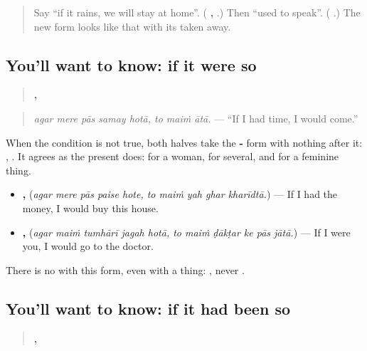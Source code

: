 \label{lesson:HI-C287-hotatoata}



\begin{quote}
Say \textquotedblleft{}if it rains, we will stay at home\textquotedblright{}. (\textbf{  ,     }.) Then \textquotedblleft{}used to speak\textquotedblright{}. (\textbf{ }.) The new form looks like that \textbf{} with its \textbf{} taken away.
\end{quote}

\subsection*{You'll want to know: if it were so}
\begin{quote}
\textbf{    ,   }
\end{quote}

\begin{quote}
\emph{agar mere pās samay hotā, to maiṁ ātā.} — \textquotedblleft{}If I had time, I would come.\textquotedblright{}
\end{quote}

When the condition is not true, both halves take the \textbf{-} form with nothing after it: \textbf{}, \textbf{}. It agrees as the present does: \textbf{} for a woman, \textbf{} for several, and \textbf{} for a feminine thing.

\begin{itemize}
\raggedright
  \item \textbf{    ,     } (\emph{agar mere pās paise hote, to maiṁ yah ghar kharīdtā.}) — If I had the money, I would buy this house.
  \item \textbf{    ,      } (\emph{agar maiṁ tumhārī jagah hotā, to maiṁ ḍākṭar ke pās jātā.}) — If I were you, I would go to the doctor.
\end{itemize}

There is no \textbf{} with this form, even with a thing: \textbf{  }, never \textbf{}.

\subsection*{You'll want to know: if it had been so}
\begin{quote}
\textbf{   ,    }
\end{quote}

